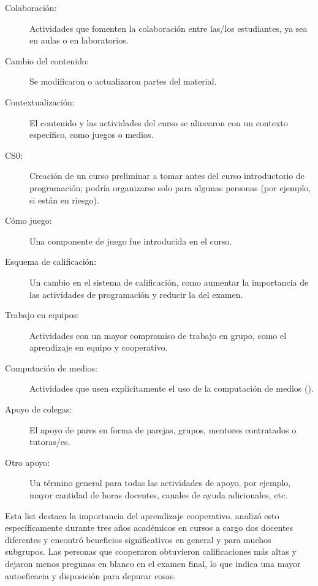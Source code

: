 \begin{description}

\item[Colaboración:]
  Actividades que fomenten la colaboración entre las/los estudiantes, ya sea en aulas o en laboratorios.

\item[Cambio del contenido:]
  Se modificaron o actualizaron partes del material.

\item[Contextualización:]
  El contenido y las actividades del curso se alinearon con un contexto específico, como juegos o medios.

\item[CS0:]
  Creación de un curso preliminar a tomar antes del curso introductorio de programación;
  podría organizarse solo para algunas personas (por ejemplo, si están en riesgo).

\item[Cómo juego:]
  Una componente de juego fue introducida en el curso.

\item[Esquema de calificación:]
  Un cambio en el sistema de calificación,
  como aumentar la importancia de las actividades de programación y reducir la del examen.

\item[Trabajo en equipos:]
  Actividades con un mayor compromiso de trabajo en grupo, como el aprendizaje en equipo y cooperativo.

\item[Computación de medios:]
  Actividades que usen explicitamente el uso de la computación de medios ().

\item[Apoyo de colegas:]
  El apoyo de pares en forma de parejas, grupos, mentores contratados o tutoras/es.

\item[Otro apoyo:]
  Un término general para todas las actividades de apoyo,
  por ejemplo, mayor cantidad de horas docentes, canales de ayuda adicionales, etc.

\end{description}


Esta list destaca la importancia del aprendizaje cooperativo.
\cite{Beck2013} analizó esto específicamente durante tres años académicos en cursos a cargo dos docentes diferentes
y encontró beneficios significativos en general y para muchos subgrupos.
Las personas que cooperaron obtuvieron calificaciones más altas
y dejaron menos pregunas en blanco en el examen final,
lo que indica una mayor autoeficacia y disposición para depurar cosas.

